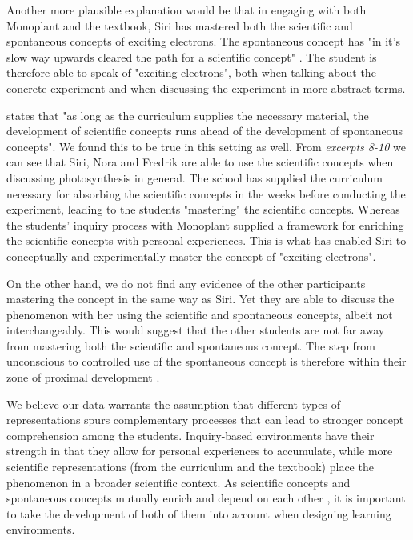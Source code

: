 Another more plausible explanation would be that in engaging with both Monoplant and the textbook, Siri has mastered both the scientific and spontaneous concepts of exciting electrons. The spontaneous concept has "in it's slow way upwards cleared the path for a scientific concept" \citep{vygotsky2012thought}. The student is therefore able to speak of "exciting electrons", both when talking about the concrete experiment and when discussing the experiment in more abstract terms. 

\citet{vygotsky2012thought} states that "as long as the curriculum supplies the necessary material, the development of scientific concepts runs ahead of the development of spontaneous concepts". We found this to be true in this setting as well. From \emph{excerpts 8-10} we can see that Siri, Nora and Fredrik are able to use the scientific concepts when discussing photosynthesis in general. The school has supplied the curriculum necessary for absorbing the scientific concepts in the weeks before conducting the experiment, leading to the students "mastering" the scientific concepts. Whereas the students' inquiry process with Monoplant supplied a framework for enriching the scientific concepts with personal experiences. This is what has enabled Siri to conceptually and experimentally master the concept of "exciting electrons".  

On the other hand, we do not find any evidence of the other participants mastering the concept in the same way as Siri. Yet they are able to discuss the phenomenon with her using the scientific and spontaneous concepts, albeit not interchangeably. This would suggest that the other students are not far away from mastering both the scientific and spontaneous concept. The step from unconscious to controlled use of the spontaneous concept is therefore within their zone of proximal development \citep{vygotsky2012thought}. 

We believe our data warrants the assumption that different types of representations spurs complementary processes that can lead to stronger concept comprehension among the students. Inquiry-based environments have their strength in that they allow for personal experiences to accumulate, while more scientific representations (from the curriculum and the textbook) place the phenomenon in a broader scientific context. As scientific concepts and spontaneous concepts mutually enrich and depend on each other \citep{vygotsky2012thought}, it is important to take the development of both of them into account when designing learning environments. 

